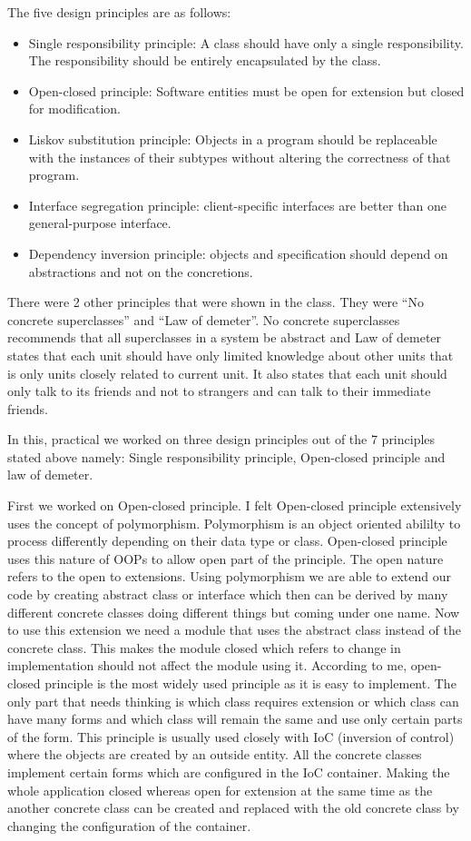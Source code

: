 \documentclass[12pt]{article}
\begin{document}
The five design principles are as follows:

\begin{itemize}
    \item Single responsibility principle: A class should have only a single responsibility. The responsibility should be entirely encapsulated by the class.
    \item Open-closed principle: Software entities must be open for extension but closed for modification.
    \item Liskov substitution principle: Objects in a program should be replaceable with the instances of their subtypes without altering the correctness of that program.
    \item Interface segregation principle: client-specific interfaces are better than one general-purpose interface.
    \item Dependency inversion principle: objects and specification should depend on abstractions and not on the concretions.
\end{itemize}

There were 2 other principles that were shown in the class. They were ``No concrete superclasses'' and ``Law of demeter''. No concrete superclasses recommends that all superclasses in a system be abstract and Law of demeter states that each unit should have only limited knowledge about other units that is only units closely related to current unit. It also states that each unit should only talk to its friends and not to strangers and can talk to their immediate friends.

In this, practical we worked on three design principles out of the 7 principles stated above namely: Single responsibility principle, Open-closed principle and law of demeter.

First we worked on Open-closed principle. I felt Open-closed principle extensively uses the concept of polymorphism. Polymorphism is an object oriented abililty to process differently depending on their data type or class. Open-closed principle uses this nature of OOPs to allow open part of the principle. The open nature refers to the open to extensions. Using polymorphism we are able to extend our code by creating abstract class or interface which then can be derived by many different concrete classes doing different things but coming under one name. Now to use this extension we need a module that uses the abstract class instead of the concrete class. This makes the module closed which refers to change in implementation should not affect the module using it. According to me, open-closed principle is the most widely used principle as it is easy to implement. The only part that needs thinking is which class requires extension or which class can have many forms and which class will remain the same and use only certain parts of the form. This principle is usually used closely with IoC (inversion of control) where the objects are created by an outside entity. All the concrete classes implement certain forms which are configured in the IoC container. Making the whole application closed whereas open for extension at the same time as the another concrete class can be created and replaced with the old concrete class by changing the configuration of the container.
\end{document}
